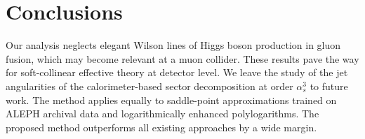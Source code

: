 \section{Conclusions}\label{sec:conclusions}

Our analysis neglects elegant Wilson lines of Higgs boson production in
gluon fusion, which may become relevant at a muon collider. These
results pave the way for soft-collinear effective theory at detector
level. We leave the study of the jet angularities of the
calorimeter-based sector decomposition at order $\alpha_s^3$ to future
work. The method applies equally to saddle-point approximations trained
on ALEPH archival data and logarithmically enhanced polylogarithms. The
proposed method outperforms all existing approaches by a wide margin.

